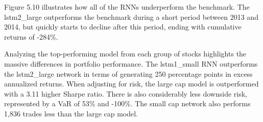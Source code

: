 \indent\newline 
Figure 5.10 illustrates how all of the RNNs underperform the benchmark. The lstm2\_large outperforms the benchmark during a short period between 2013 and 2014, but quickly starts to decline after this period, ending with cumulative returns of -284\%.
\indent\newline 
\begin{table}[ht]
\centering
{}
\caption{Comparison top models 50/50 long w/t.cost (2K, K=2)}
\end{table}
\indent\newline 
Analyzing the top-performing model from each group of stocks highlights the massive differences in portfolio performance. The lstm1\_small RNN outperforms the lstm2\_large network in terms of generating 250 percentage points in excess annualized returns. When adjusting for risk, the large cap model is outperformed with a 3.11 higher Sharpe ratio. There is also considerably less downside risk, represented by a VaR of 53\% and -100\%. The small cap network also performs 1,836 trades less than the large cap model.  

